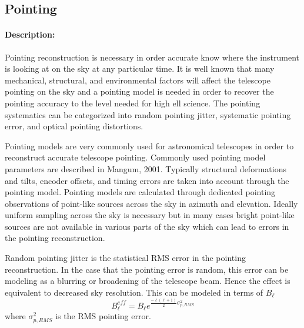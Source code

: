 \subsection{Pointing}

\paragraph{Description:}
Pointing reconstruction is necessary in order accurate know where the instrument is looking at on the sky at any particular time. It is well known that many mechanical, structural, and environmental factors will affect the telescope pointing on the sky and a pointing model is needed in order to recover the pointing accuracy to the level needed for high ell science. The pointing systematics can be categorized into random pointing jitter, systematic pointing error, and optical pointing distortions.

Pointing models are very commonly used for astronomical telescopes in order to reconstruct accurate telescope pointing. Commonly used pointing model parameters are described in Mangum, 2001. Typically structural deformations and tilts, encoder offsets, and timing errors are taken into account through the pointing model. Pointing models are calculated through dedicated pointing observations of point-like sources across the sky in azimuth and elevation. Ideally uniform sampling across the sky is necessary but in many cases bright point-like sources are not available in various parts of the sky which can lead to errors in the pointing reconstruction.

Random pointing jitter is the statistical RMS error in the pointing reconstruction. In the case that the pointing error is random, this error can be modeling as a blurring or broadening of the telescope beam. Hence the effect is equivalent to decreased sky resolution. This can be modeled in terms of $B_{\ell}$
\begin{equation}
B_{\ell}^{eff} = B_{\ell} e^{\frac{-\ell(\ell+1)}{2} \sigma^{2}_{p,RMS}}
\end{equation}
where $\sigma^{2}_{p,RMS}$ is the RMS pointing error. 

